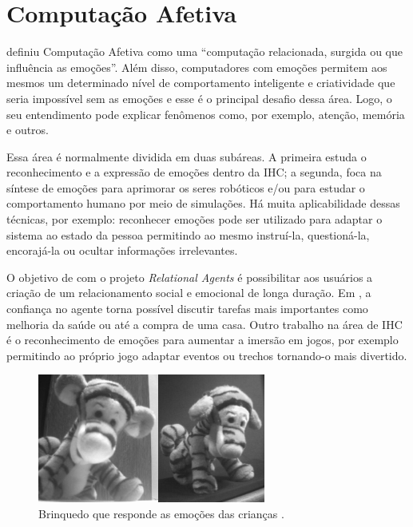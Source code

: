 \section{Computação Afetiva}

\citet{Pic98} definiu Computação Afetiva como uma ``computação relacionada,
surgida ou que influência as emoções''. Além disso, computadores com emoções
permitem aos mesmos um determinado nível de comportamento inteligente e
criatividade que seria impossível sem as emoções e esse é o principal desafio
dessa área. Logo, o seu entendimento pode explicar fenômenos como, por
exemplo, atenção, memória e outros.

Essa área é normalmente dividida em duas subáreas. A primeira estuda o
reconhecimento e a expressão de emoções dentro da IHC;
a segunda, foca na síntese de emoções para aprimorar os seres robóticos e/ou
para estudar o comportamento humano por meio de simulações. Há muita
aplicabilidade dessas técnicas, por exemplo: reconhecer emoções pode ser
utilizado para adaptar o sistema ao estado da pessoa permitindo ao
mesmo instruí-la, questioná-la, encorajá-la ou ocultar informações irrelevantes.

O objetivo de \citet{bick2003relational} com o projeto \emph{Relational
Agents} é possibilitar aos usuários a criação de um relacionamento social e
emocional de longa duração.  Em \citet{bickmore2009virtual}, a confiança no
agente torna possível discutir tarefas mais importantes como melhoria da saúde
ou até a compra de uma casa. Outro trabalho na área de IHC é o reconhecimento
de emoções para aumentar a imersão em jogos, por exemplo permitindo ao próprio
jogo adaptar eventos ou trechos tornando-o mais divertido.

\begin{figure}
  \begin{center}
    \includegraphics[width=75mm]{figuras/tigger-mit.png}
  \end{center}
  \caption[Brinquedo que responde as emoções das crianças.]{Brinquedo que responde as emoções das crianças \cite{kirsch1999affective}.}
  \label{fig:tigger-mit}
\end{figure}

